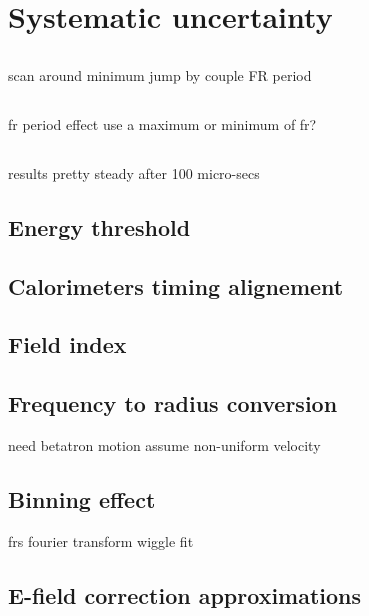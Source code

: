 \section{Systematic uncertainty}

\subsection{\tz}

scan around minimum
jump by couple FR period

\subsection{\ts}

fr period effect
use a maximum or minimum of fr?

\subsection{\tm}

results pretty steady after 100 micro-secs

\subsection{Energy threshold}
\subsection{Calorimeters timing alignement}
\subsection{Field index}
\subsection{Frequency to radius conversion}

need betatron motion
assume non-uniform velocity

\subsection{Binning effect}

frs
fourier transform
wiggle fit

\subsection{E-field correction approximations}
